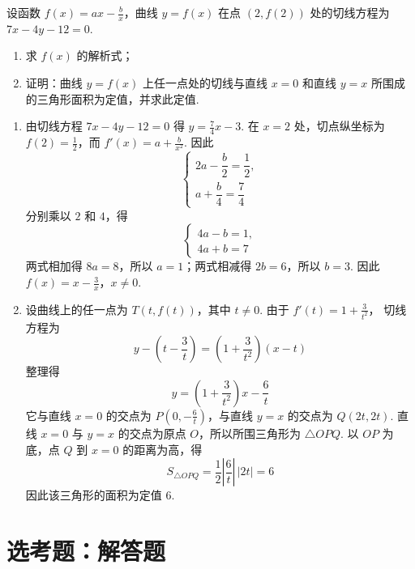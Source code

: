 \begin{problem}
设函数 \( f(x) = ax - \frac{b}{x} \)，曲线 \( y = f(x) \) 在点 \((2, f(2))\) 处的切线方程为 \( 7x - 4y - 12 = 0 \).

\begin{enumerate}
\item 求 \( f(x) \) 的解析式；
\item 证明：曲线 \( y = f(x) \) 上任一点处的切线与直线 \( x = 0 \) 和直线 \( y = x \) 所围成的三角形面积为定值，并求此定值.
\end{enumerate}

\begin{solution}
\begin{enumerate}
\item 由切线方程 \(7x-4y-12=0\) 得 \(y=\frac{7}{4}x-3\). 在 \(x=2\) 处，切点纵坐标为 \(f(2)=\frac12\)，而 \(f'(x)=a+\frac{b}{x^{2}}\).
因此
\[
\begin{cases}
2a-\dfrac{b}{2}=\dfrac12,\\
a+\dfrac{b}{4}=\dfrac74
\end{cases}
\]
分别乘以 \(2\) 和 \(4\)，得
\[
\begin{cases}
4a-b=1,\\
4a+b=7
\end{cases}
\]
两式相加得 \(8a=8\)，所以 \(a=1\)；两式相减得 \(2b=6\)，所以 \(b=3\). 因此
\(f(x)=x-\frac{3}{x}\)，\(x\ne0\).

\item 设曲线上的任一点为 \(T(t,f(t))\)，其中 \(t\ne0\). 由于
\(f'(t)=1+\frac{3}{t^{2}}\)，
切线方程为
\[
y-\left(t-\frac{3}{t}\right)=\left(1+\frac{3}{t^{2}}\right)(x-t)
\]
整理得
\[
y=\left(1+\frac{3}{t^{2}}\right)x-\frac{6}{t}
\]
它与直线 \(x=0\) 的交点为 \(P\left(0,-\frac{6}{t}\right)\)，与直线 \(y=x\) 的交点为 \(Q(2t,2t)\). 直线 \(x=0\) 与 \(y=x\) 的交点为原点 \(O\)，所以所围三角形为 \(\triangle OPQ\). 以 \(OP\) 为底，点 \(Q\) 到 \(x=0\) 的距离为高，得
\[
S_{\triangle OPQ}=\frac12\left|\frac{6}{t}\right|\,|2t|=6
\]
因此该三角形的面积为定值 \(6\).
\end{enumerate}
\end{solution}
\end{problem}

\section{选考题：解答题}

